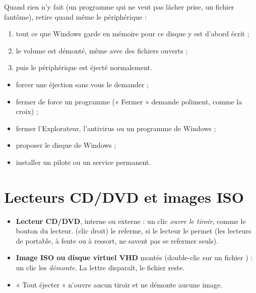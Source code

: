 Quand rien n'y fait (un programme qui ne veut pas lâcher prise, un fichier fantôme),
 retire quand même le périphérique :
\begin{enumerate}
\item tout ce que Windows garde en mémoire pour ce disque y est d'abord écrit ;
\item le volume est démonté, même avec des fichiers ouverts ;
\item puis le périphérique est éjecté normalement.
\end{enumerate}


\begin{securitebox}
\begin{itemize}[leftmargin=4mm]
\item forcer une éjection sans vous le demander ;
\item fermer de force un programme (« Fermer » demande poliment, comme la croix) ;
\item fermer l'Explorateur, l'antivirus ou un programme de Windows ;
\item proposer le disque de Windows ;
\item installer un pilote ou un service permanent.
\end{itemize}
\end{securitebox}

\section{Lecteurs CD/DVD et images ISO}
\begin{itemize}
\item \textbf{Lecteur CD/DVD}, interne ou externe : un clic \emph{ouvre le tiroir}, comme
  le bouton du lecteur.  (clic droit) le referme, si le lecteur le
  permet (les lecteurs de portable, à fente ou à ressort, ne savent pas se refermer seuls).
\item \textbf{Image ISO ou disque virtuel VHD} montés (double-clic sur un fichier
  ) : un clic les \emph{démonte}. La lettre disparaît, le fichier reste.
\item « Tout éjecter » n'ouvre aucun tiroir et ne démonte aucune image.
\end{itemize}

